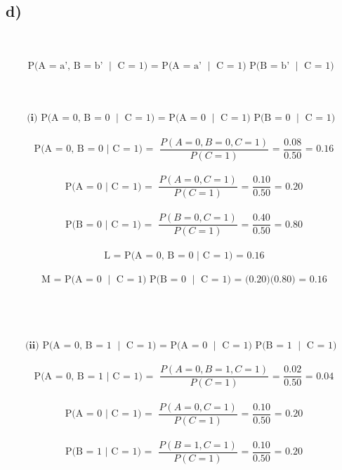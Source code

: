\documentclass[11pt]{article}
\begin{document}
\subsection*{d)}
\\
\\
\[\text{P(A = a', B = b' $\mid$ C = 1) = P(A = a' $\mid$ C = 1) P(B = b' $\mid$ C = 1) }\]\\
\\
\\
\[\textbf{(i) } \text{P(A = 0, B = 0 $\mid$ C = 1) = P(A = 0 $\mid$ C = 1) P(B = 0 $\mid$ C = 1) }\]\\
\[\text{P(A = 0, B = 0 $\mid$ C = 1) = } \frac{P(A = 0, B = 0, C=1)}{P(C = 1)} \text{ = } \frac{0.08}{0.50} \text{ = 0.16}\]\\
\[\text{P(A = 0 $\mid$ C = 1) = } \frac{P(A = 0, C=1)}{P(C = 1)} \text{ = } \frac{0.10}{0.50} \text{ = 0.20}\]\\
\[\text{P(B = 0 $\mid$ C = 1) = } \frac{P(B = 0, C=1)}{P(C = 1)} \text{ = } \frac{0.40}{0.50} \text{ = 0.80}\]\\
\[\text{ L = P(A = 0, B = 0 $\mid$ C = 1) = 0.16}\]\\
\[\text{ M = P(A = 0 $\mid$ C = 1) P(B = 0 $\mid$ C = 1) = (0.20)(0.80) = 0.16}\]\\
\\
\\
\vspace*{1.2cm}\\
\[\textbf{(ii) } \text{P(A = 0, B = 1 $\mid$ C = 1) = P(A = 0 $\mid$ C = 1) P(B = 1 $\mid$ C = 1) }\]\\
\[\text{P(A = 0, B = 1 $\mid$ C = 1) = } \frac{P(A = 0, B = 1, C=1)}{P(C = 1)} \text{ = } \frac{0.02}{0.50} \text{ = 0.04}\]\\
\[\text{P(A = 0 $\mid$ C = 1) = } \frac{P(A = 0, C=1)}{P(C = 1)} \text{ = } \frac{0.10}{0.50} \text{ = 0.20}\]\\
\[\text{P(B = 1 $\mid$ C = 1) = } \frac{P(B = 1, C=1)}{P(C = 1)} \text{ = } \frac{0.10}{0.50} \text{ = 0.20}\]\\
\end{document}
